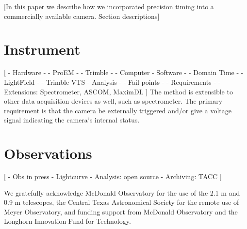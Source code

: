 \documentclass[preprint2]{aastex}
\begin{document}
[In this paper we describe how we incorporated precision timing into a commercially available camera. Section descriptions]

\section{Instrument}


[
- Hardware
- - ProEM
- - Trimble
- - Computer
- Software
- - Domain Time
- - LightField
- - Trimble VTS
- Analysis
- - Fail points
- - Requirements
- - Extensions: Spectrometer, ASCOM, MaximDL
]
The method is extensible to other data acquisition devices as well, such as spectrometer. The primary requirement is that the camera be externally triggered and/or give a voltage signal indicating the camera's internal status. 

\section{Observations}

[
- Obs in press
- Lightcurve
- Analysis: open source
- Archiving: TACC
]

\acknowledgments

We gratefully acknowledge McDonald Observatory for the use of the 2.1 m and 0.9 m telescopes, the Central Texas Astronomical Society for the remote use of Meyer Observatory, and funding support from McDonald Observatory and the Longhorn Innovation Fund for Technology.



\clearpage

\end{document}
